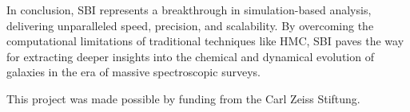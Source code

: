 \documentclass{aa}
\begin{document}
In conclusion, SBI represents a breakthrough in simulation-based analysis, delivering unparalleled speed, precision, and scalability. By overcoming the computational limitations of traditional techniques like HMC, SBI paves the way for extracting deeper insights into the chemical and dynamical evolution of galaxies in the era of massive spectroscopic surveys.



\begin{acknowledgements}
      This project was made possible by funding from the Carl Zeiss Stiftung.
\end{acknowledgements}

%
%



\end{document}
